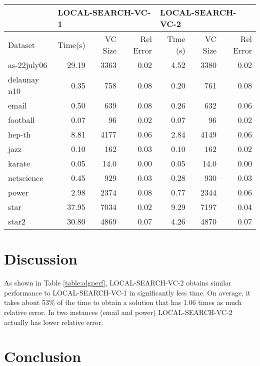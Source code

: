 \documentclass[sigconf]{acmart}
\begin{document}
\begin{table*}[h]
	\caption{Algorithm Performance}
	\label{table:algperf}
	\begin{tabular}{lrrrrrr}
		\toprule
		& \multicolumn{3}{l}{LOCAL-SEARCH-VC-1} & \multicolumn{3}{l}{LOCAL-SEARCH-VC-2} \\ \midrule
		Dataset & Time(s)    & VC Size   & Rel Error  & Time (s)   & VC Size   & Rel Error  \\ \midrule
		as-22july06    & 29.19   & 3363      & 0.02   & 4.52   & 3380      & 0.02   \\
		delaunay n10    & 0.35   & 758      & 0.08   & 0.20   & 761      & 0.08   \\
		email    & 0.50   & 639      & 0.08   & 0.26   & 632      & 0.06   \\
		football    & 0.07   & 96      & 0.02   & 0.07   & 96      & 0.02   \\
		hep-th    & 8.81   & 4177      & 0.06   & 2.84   & 4149      & 0.06   \\
		jazz    & 0.10   & 162      & 0.03   & 0.10   & 162      & 0.02   \\
		karate    & 0.05   & 14.0      & 0.00   & 0.05   & 14.0      & 0.00   \\
		netscience    & 0.45   & 929      & 0.03   & 0.28   & 930      & 0.03   \\
		power    & 2.98   & 2374      & 0.08   & 0.77   & 2344      & 0.06   \\
		star    & 37.95   & 7034      & 0.02   & 9.29   & 7197      & 0.04   \\
		star2    & 30.80   & 4869      & 0.07   & 4.26   & 4870      & 0.07   \\
		\bottomrule
	\end{tabular}
\end{table*}

\section{Discussion}
As shown in Table \ref{table:algperf}, LOCAL-SEARCH-VC-2 obtains similar performance to LOCAL-SEARCH-VC-1 in significantly less time. On average, it takes about 53\% of the time to obtain a solution that has 1.06 times as much relative error. In two instances (email and power) LOCAL-SEARCH-VC-2 actually has lower relative error.

\section{Conclusion}


 
\end{document}
